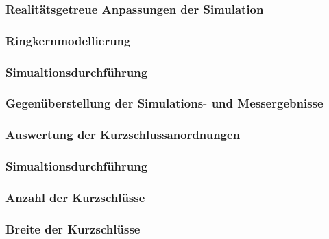 \documentclass[accentcolor=tud9b, colorbacktitle, inverttitle]{tudbeamer}
\begin{document}
\begin{frame}\frametitle{Realit\"atsgetreue Anpassungen der Simulation}

\end{frame}



\begin{frame}\frametitle{Ringkernmodellierung}

\end{frame}



\begin{frame}\frametitle{Simualtionsdurchf\"uhrung}

\end{frame}



\begin{frame}\frametitle{Gegen\"uberstellung der Simulations- und Messergebnisse}

\end{frame}



\begin{frame}\frametitle{Auswertung der Kurzschlussanordnungen}

\end{frame}



\begin{frame}\frametitle{Simualtionsdurchf\"uhrung}

\end{frame}





\begin{frame}\frametitle{Anzahl der Kurzschl\"usse}
\end{frame}



\begin{frame}\frametitle{Breite der Kurzschlüsse}
\end{frame}
\end{document}
